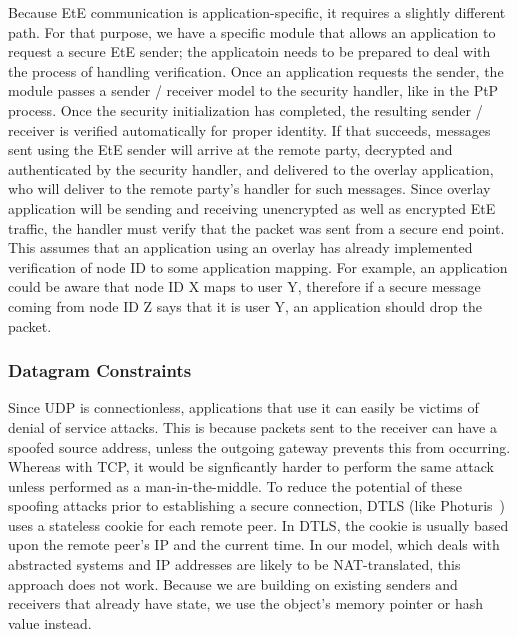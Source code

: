 \documentclass[conference]{IEEEtran}
\begin{document}
Because EtE communication is application-specific, it requires
a slightly different path.  For that purpose, we have a specific module that
allows an application to request a secure EtE sender; the applicatoin needs to be prepared to deal with the
process of handling verification.  Once an application requests the sender, the
module passes a sender / receiver model to the security handler, like in the PtP
process.  Once the security initialization has completed, the
resulting sender / receiver is verified automatically for proper identity.
If that succeeds, messages sent using the EtE sender will arrive at the remote
party, decrypted and authenticated by the security handler, and delivered to the
overlay application, who will deliver to the remote party's handler for such messages.
Since overlay application will be sending and receiving
unencrypted as well as encrypted EtE traffic, the handler must verify that the
packet was sent from a secure end point.  This assumes that an application using
an overlay has already implemented verification of node ID to some application
mapping.  For example, an application could be aware that node ID X maps to user
Y, therefore if a secure message coming from node ID Z says that it is user Y,
an application should drop the packet.

\subsubsection{Datagram Constraints}
Since UDP is connectionless, applications that use it can easily be victims of
denial of service attacks.  This is because packets sent to the receiver can
have a spoofed source address, unless the outgoing gateway prevents this from
occurring.  Whereas with TCP, it would be signficantly harder to perform the
same attack unless performed as a man-in-the-middle.  To reduce the potential
of these spoofing attacks prior to establishing a secure connection, DTLS (like
Photuris~\cite{photuris}) uses a stateless cookie for each remote peer.  In
DTLS, the cookie is usually based upon the remote peer's IP and the current
time.  In our model, which deals with abstracted systems and IP addresses are likely to be NAT-translated, this approach does
not work.  Because we are building on existing senders and receivers
that already have state, we use the object's memory pointer or hash value
instead.
\end{document}

